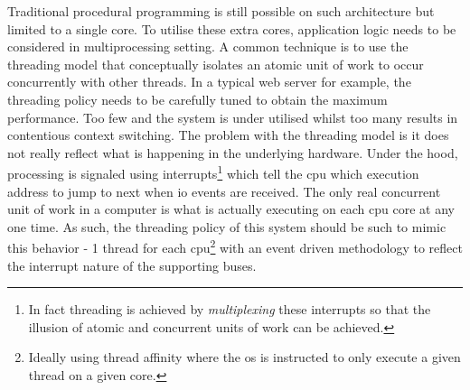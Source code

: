 \documentclass[a4paper,11pt]{scrreprt}
\begin{document}
Traditional procedural programming is still possible on such architecture but limited to a single core. To utilise these extra cores, application logic needs to be considered in multiprocessing setting. A common technique is to use the threading model that conceptually isolates an atomic unit of work to occur concurrently with other threads. In a typical web server for example, the threading policy needs to be carefully tuned to obtain the maximum performance. Too few and the system is under utilised whilst too many results in contentious context switching. The problem with the threading model is it does not really reflect what is happening in the underlying hardware. Under the hood, processing is signaled using interrupts\footnote{In fact threading is achieved by \textit{multiplexing} these interrupts so that the illusion of atomic and concurrent units of work can be achieved.} which tell the \acrshort{cpu} which execution address to jump to next when \acrshort{io} events are received. The only real concurrent unit of work in a computer is what is actually executing on each \acrshort{cpu} core at any one time. As such, the threading policy of this system should be such to mimic this behavior - 1 thread for each \acrshort{cpu}\footnote{Ideally using thread affinity where the \acrshort{os} is instructed to only execute a given thread on a given core.} with an event driven methodology to reflect the interrupt nature of the supporting buses.
\end{document}
